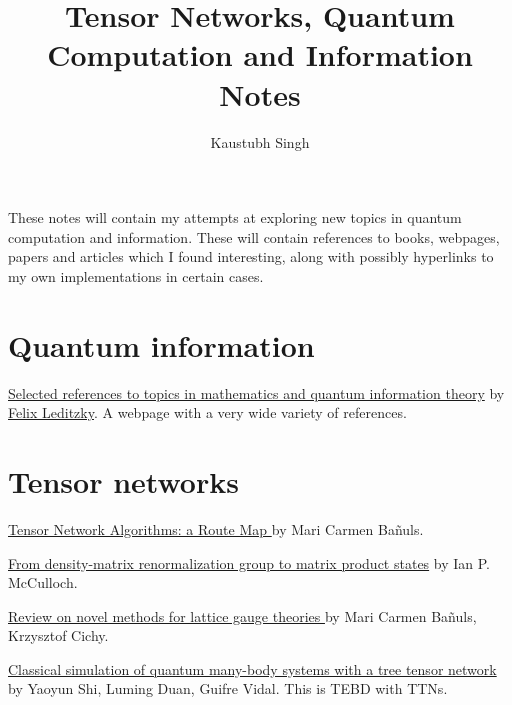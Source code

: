 \documentclass{article}
\title{Tensor Networks, Quantum Computation and Information Notes}
\author{Kaustubh Singh}
\newcommand{\vs}[1][1]{         %
    \vspace{#1em}
}
\begin{document}

\maketitle

\begin{center}
    These notes will contain my attempts at exploring new topics in quantum computation and information. These will contain references to books, webpages, papers and articles which I found interesting, along with possibly hyperlinks to my own implementations in certain cases. 
\end{center}

\section{Quantum information}

\href{https://felixleditzky.info/selected_references.html#intros}{Selected references to topics in mathematics and quantum information theory} by \href{https://felixleditzky.info/}{Felix Leditzky}. A webpage with a very wide variety of references. 

\section{Tensor networks}
\href{https://arxiv.org/abs/2205.10345}{Tensor Network Algorithms: a Route Map
} by Mari Carmen Bañuls.


\vs

\href{https://arxiv.org/abs/cond-mat/0701428}{From density-matrix renormalization group to matrix product states} by Ian P. McCulloch.

\vs

\href{https://arxiv.org/abs/1910.00257}{Review on novel methods for lattice gauge theories
} by Mari Carmen Bañuls, Krzysztof Cichy.

\vs 

\href{https://arxiv.org/abs/quant-ph/0511070}{Classical simulation of quantum many-body systems with a tree tensor network
} by Yaoyun Shi, Luming Duan, Guifre Vidal. This is TEBD with TTNs. 
\end{document}
